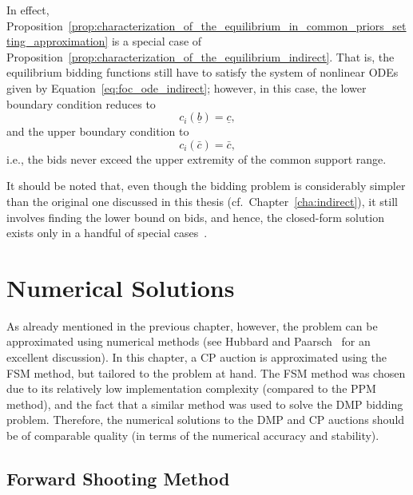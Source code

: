 In effect, Proposition~\ref{prop:characterization_of_the_equilibrium_in_common_priors_setting_approximation} is a special case of Proposition~\ref{prop:characterization_of_the_equilibrium_indirect}. That is, the equilibrium bidding functions still have to satisfy the system of nonlinear ODEs given by Equation~\eqref{eq:foc_ode_indirect}; however, in this case, the lower boundary condition reduces to
\begin{equation*}
  c_i(\underline{b}) = \underline{c},
\end{equation*}
and the upper boundary condition to
\begin{equation*}
  c_i(\bar{c}) = \bar{c},
\end{equation*}
i.e., the bids never exceed the upper extremity of the common support range.

It should be noted that, even though the bidding problem is considerably simpler than the original one discussed in this thesis (cf.~Chapter~\ref{cha:indirect}), it still involves finding the lower bound on bids, and hence, the closed-form solution exists only in a handful of special cases~\cite{Krishna10,HubbardPaarsch2011}.


\section{Numerical Solutions} %
\label{sec:numerical_solutions}
As already mentioned in the previous chapter, however, the problem can be approximated using numerical methods (see Hubbard and Paarsch~\cite{HubbardPaarsch2011} for an excellent discussion). In this chapter, a CP auction is approximated using the FSM method, but tailored to the problem at hand. The FSM method was chosen due to its relatively low implementation complexity (compared to the PPM method), and the fact that a similar method was used to solve the DMP bidding problem. Therefore, the numerical solutions to the DMP and CP auctions should be of comparable quality (in terms of the numerical accuracy and stability).

\subsection{Forward Shooting Method} %
\label{sub:forward_shooting_method}

